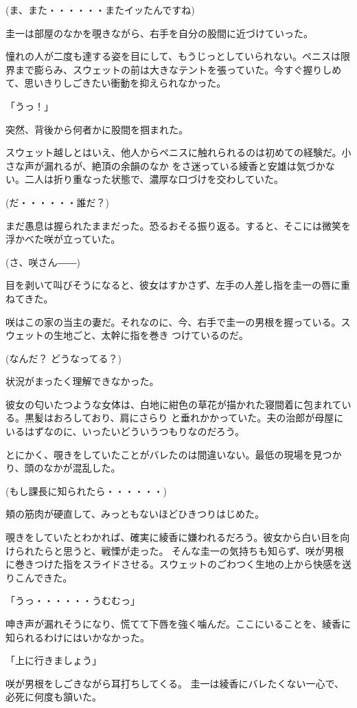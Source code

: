 ﻿\documentclass[book,tate]{jlreq}
\begin{document}
(ま、また・・・・・・またイッたんですね)

圭一は部屋のなかを覗きながら、右手を自分の股間に近づけていった。

憧れの人が二度も達する姿を目にして、もうじっとしていられない。ペニスは限界まで膨らみ、スウェットの前は大きなテントを張っていた。今すぐ握りしめて、思いきりしごきたい衝動を抑えられなかった。

「うっ！」

突然、背後から何者かに股間を掴まれた。

スウェット越しとはいえ、他人からペニスに触れられるのは初めての経験だ。小さな声が漏れるが、絶頂の余韻のなか をさ迷っている綾香と安雄は気づかない。二人は折り重なった状態で、濃厚な口づけを交わしていた。

(だ・・・・・・誰だ？)

まだ愚息は握られたままだった。恐るおそる振り返る。すると、そこには微笑を浮かべた咲が立っていた。

(さ、咲さん――)

目を剥いて叫びそうになると、彼女はすかさず、左手の人差し指を圭一の唇に重ねてきた。

咲はこの家の当主の妻だ。それなのに、今、右手で圭一の男根を握っている。スウェットの生地ごと、太幹に指を巻き つけているのだ。

(なんだ？ どうなってる？)

状況がまったく理解できなかった。

彼女の匂いたつような女体は、白地に紺色の草花が描かれた寝間着に包まれている。黒髪はおろしており、肩にさらり と垂れかかっていた。夫の治郎が母屋にいるはずなのに、いったいどういうつもりなのだろう。

とにかく、覗きをしていたことがバレたのは間違いない。最低の現場を見つかり、頭のなかが混乱した。

(もし課長に知られたら・・・・・・)

頬の筋肉が硬直して、みっともないほどひきつりはじめた。

覗きをしていたとわかれば、確実に綾香に嫌われるだろう。彼女から白い目を向けられたらと思うと、戦慄が走った。 そんな圭一の気持ちも知らず、咲が男根に巻きつけた指をスライドさせる。スウェットのごわつく生地の上から快感を送りこんできた。

「うっ・・・・・・うむむっ」

呻き声が漏れそうになり、慌てて下唇を強く噛んだ。ここにいることを、綾香に知られるわけにはいかなかった。

「上に行きましょう」

咲が男根をしごきながら耳打ちしてくる。 圭一は綾香にバレたくない一心で、必死に何度も頷いた。
\end{document}
